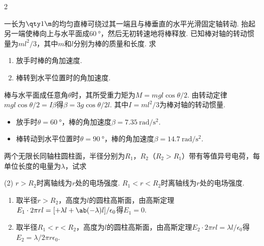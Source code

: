 \begin{paracol}{2}
\begin{problem}
    一长为$\qty1\m$的均匀直棒可绕过其一端且与棒垂直的水平光滑固定轴转动. 抬起另一端使棒向上与水平面成$\qty{60}\degree$，然后无初转速地将棒释放. 已知棒对轴的转动惯量为$ml^2/3$，其中$m$和$l$分别为棒的质量和长度. 求
    \begin{enumerate}
        \item 放手时棒的角加速度.
        \item 棒转到水平位置时的角加速度.
    \end{enumerate}
    \switchcolumn\vspace*{\fill}\centering
    \vspace*{\fill}
\end{problem}
\end{paracol}
\begin{solution}
    棒与水平面成任意角$\theta$时，其所受重力矩为$M=mgl\cos\theta/2$. 由转动定律$mgl\cos\theta/2=I\beta$得$\beta=3g\cos\theta/2l$. 其中$I=ml^2/3$为棒对轴的转动惯量.
    \begin{itemize}
        \item 放手时$\theta=\qty{60}\degree$，棒的角加速度$\beta=\qty{7.35}{\radian/\s^2}$.
        \item 棒转动到水平位置时$\theta=\qty{90}\degree$，棒的角加速度$\beta=\qty{14.7}{\radian/\s^2}$.
    \end{itemize}
\end{solution}

\begin{problem}
    两个无限长同轴柱圆柱面，半径分别为$R_1$，$R_2$（$R_2>R_1$）带有等值异号电荷，每单位长度的电量为$\lambda$，试求
    \begin{tasks}[label=\arabic*.](2)
        \task $r>R_2$时离轴线为$r$处的电场强度.
        \task $R_1<r<R_2$时离轴线为$r$处的电场强度.
    \end{tasks}
\end{problem}
\begin{solution}\leavevmode
    \begin{enumerate}
        \item 取半径$r>R_2$，高度为$l$的圆柱高斯面，由高斯定理$E_1\cdot 2\pi rl=[+\lambda l+\ab(-\lambda)l]/\epsilon_0$得$E_1=0$.
        \item 取半径$R_1<r<R_2$，高度为$l$的圆柱高斯面，由高斯定理$E_2\cdot 2\pi rl=\lambda l/\epsilon_0$得$E_2=\lambda/2\pi r\epsilon_0$.
    \end{enumerate}
\end{solution}

